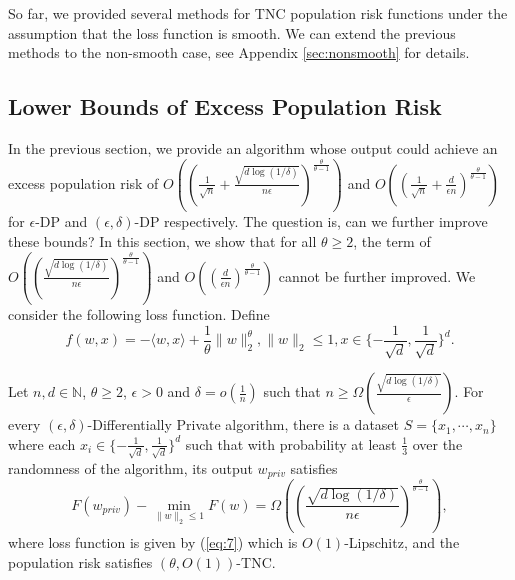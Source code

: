 \documentclass[12pt]{alt2022} %
\begin{document}
So far, we provided several methods for TNC population risk functions under the assumption that the loss function is smooth. We can extend the previous methods to the non-smooth case, see Appendix \ref{sec:nonsmooth} for details. 
\subsection{Lower Bounds of Excess Population Risk}
	In the previous section, we provide an algorithm whose output could achieve an excess population risk of $O((\frac{1}{\sqrt{n}}+\frac{\sqrt{d\log(1/\delta)}}{n\epsilon})^{\frac{\theta}{\theta-1}})$ and $O((\frac{1}{\sqrt{n}}+\frac{d}{\epsilon n})^{\frac{\theta}{\theta-1}})$ for $\epsilon$-DP and $(\epsilon, \delta)$-DP respectively. The question is, can we further improve these bounds? 
	In this section, we show that  for all $\theta\geq 2$, the term of $O((\frac{\sqrt{d\log(1/\delta)}}{n\epsilon})^{\frac{\theta}{\theta-1}})$ and $O((\frac{d}{\epsilon n})^{\frac{\theta}{\theta-1}})$ cannot be further improved. We consider the following loss function. Define
	\begin{equation}\label{eq:7}
	    f(w, x)=-\langle w, x \rangle+ \frac{1}{\theta}\|w\|_2^\theta, \|w\|_2\leq 1, x\in \{-\frac{1}{\sqrt{d}}, \frac{1}{\sqrt{d}}\}^d. 
	\end{equation}
	
	
	\begin{theorem}\label{thm:3}
		Let $n,d\in \mathbb{N}$, $\theta\geq 2$, $\epsilon>0$  and $\delta=o(\frac{1}{n})$ such that $n\geq \Omega (\frac{\sqrt{d\log(1/\delta)}}{\epsilon})$. For every $(\epsilon, \delta)$-Differentially Private algorithm, there is a dataset $S=\{x_1, \cdots, x_n\}$ where each $x_i\in \{-\frac{1}{\sqrt{d}}, \frac{1}{\sqrt{d}}\}^d$ such that with probability at least $\frac{1}{3}$ over the randomness of the algorithm, its output $w_{priv}$ satisfies
			\begin{equation*}
		F(w_{priv})-\min_{\|w\|_2\leq 1}F(w) = \Omega \left(     
	(\frac{\sqrt{d\log(1/\delta)}}{n\epsilon})^{\frac{\theta}{\theta-1}}
		\right), 
		\end{equation*}
		where loss function  is given by (\ref{eq:7})
		which is $O(1)$-Lipschitz, and the population risk  satisfies $(\theta, O(1))$-TNC. 
	\end{theorem}
	
\end{document}
